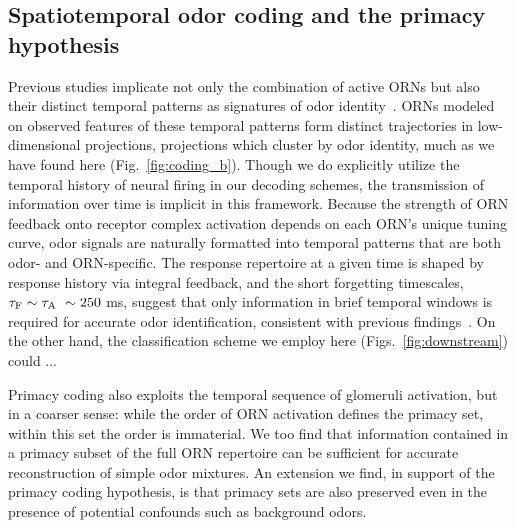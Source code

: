 \documentclass[9pt,twocolumn,twoside,lineno]{pnas-new}
\begin{document}



\subsection{Spatiotemporal odor coding and the primacy hypothesis}

Previous studies implicate not only the combination of active ORNs but also their distinct temporal patterns as signatures of odor identity~\cite{stopfer_temporal_model, multiple_timescales_stopfer, stopfer_nat_neuro, stopfer_temporal_channel}. ORNs modeled on observed features of these temporal patterns form distinct trajectories in low-dimensional projections, projections which cluster by odor identity, much as we have found here (Fig.~\ref{fig:coding_b}). Though we do explicitly utilize the temporal history of neural firing in our decoding schemes, the transmission of information over time is implicit in this framework. Because the strength of ORN feedback onto receptor complex activation
depends on each ORN's unique tuning curve, odor signals are naturally formatted into temporal patterns that are both odor- and ORN-specific. The response repertoire at a given time is shaped by response history via integral feedback, and the short forgetting timescales, $\tau_{\textup F} \sim \tau_{\textup A} ~ \sim 250$ ms, suggest that only information in brief temporal windows is required for accurate odor identification, consistent with previous findings~\cite{stopfer_nat_neuro}. On the other hand, the classification scheme we employ here (Figs.~\ref{fig:downstream}) could ...



Primacy coding also exploits the temporal sequence of glomeruli activation, but in a coarser sense: while the order of ORN activation defines the primacy set, within this set the order is immaterial. We too find that information contained in a primacy subset of the full ORN repertoire can be sufficient for accurate reconstruction of simple odor mixtures. An extension we find, in support of the primacy coding hypothesis, is that primacy sets are also preserved even in the presence of potential confounds such as background odors. 
\end{document}
